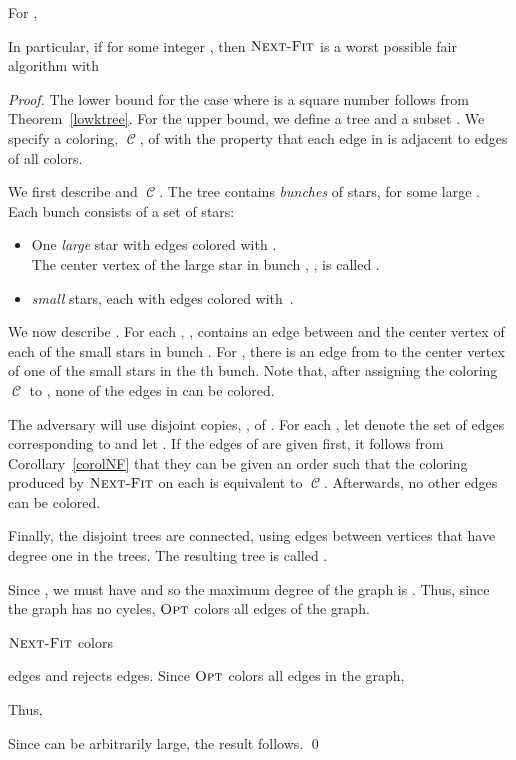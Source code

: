 \documentclass[smallextended]{svjour3}
\newcommand{\coloring}{\ensuremath{\operatorname{\mathscr{C}}}\xspace}
\newcommand{\NF}{\ensuremath{\operatorname{\textsc{Next-Fit}}}\xspace}
\newcommand{\OPT}{\ensuremath{\operatorname{\textsc{Opt}}}\xspace}
\begin{document}
\begin{theorem}
\label{upperNFtrees}
For , 

In particular, if  for some integer , then \NF is a worst possible
fair algorithm with

\end{theorem}
\begin{proof}
The lower bound for the case where  is a square number follows from Theorem~\ref{lowktree}. 
For the upper bound, we define a tree  and a subset
 .
We specify a coloring, \coloring, of  with the property that
 each edge in  is adjacent to edges of all  colors.

We first describe  and \coloring.
The tree  contains  \emph{bunches} of stars, for some large . 
Each bunch consists of a set of stars:
\begin{itemize}
\item One {\em large} star with  edges
  colored with .\\
 The center vertex of the large star in bunch , , is
  called .
\item  {\em small} stars, each with  edges
 colored with \,.
\end{itemize}

We now describe .
For each , ,  contains an edge between  and the center vertex of each of the small stars in bunch .
For , there is an edge from  to the center vertex of one of the 
 small stars in the th bunch. 
Note that, after assigning the coloring \coloring to , none of the
 edges in  can be colored.

The adversary will use  disjoint copies, , of
 . 
For each , let  denote the set of edges corresponding to
  and let .
If the edges of  are given
 first, it follows from Corollary~\ref{corolNF} that they can be given
 an order such that the coloring produced by \NF on each  is
 equivalent to \coloring.
Afterwards, no other edges can be colored.

Finally, the  disjoint trees are connected, using  edges
 between vertices that have degree one in the trees.
The resulting tree is called .

Since , we must have  and so the maximum
degree of the graph is . 
Thus, since the graph has no cycles, \OPT colors all edges of the graph.

\NF colors

 edges and rejects  edges. 
Since \OPT colors all edges in the graph, 
  
Thus, 
 
Since  can be arbitrarily large, the result follows.
\qed\end{proof}
\end{document}
